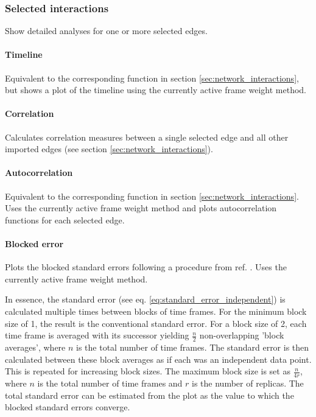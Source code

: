 \subsubsection{Selected interactions}

Show detailed analyses for one or more selected edges.

\paragraph{Timeline} Equivalent to the corresponding function in section \ref{sec:network_interactions}, but shows a plot of the timeline using the currently active frame weight method.

\paragraph{Correlation} Calculates correlation measures between a single selected edge and all other imported edges (see section \ref{sec:network_interactions}). 

\paragraph{Autocorrelation} Equivalent to the corresponding function in section \ref{sec:network_interactions}. Uses the currently active frame weight method and plots autocorrelation functions for each selected edge.

\paragraph{Blocked error} Plots the blocked standard errors following a procedure from ref. \cite{Grossfield2009}. Uses the currently active frame weight method.

In essence, the standard error (see eq. \ref{eq:standard_error_independent}) is calculated multiple times between blocks of time frames. For the minimum block size of 1, the result is the conventional standard error. For a block size of 2, each time frame is averaged with its successor yielding $\frac{n}{2}$ non-overlapping 'block averages', where $n$ is the total number of time frames. The standard error is then calculated between these block averages as if each was an independent data point. This is repeated for increasing block sizes. The maximum block size is set as $\frac{n}{4r}$, where $n$ is the total number of time frames and $r$ is the number of replicas. The total standard error can be estimated from the plot as the value to which the blocked standard errors converge.

